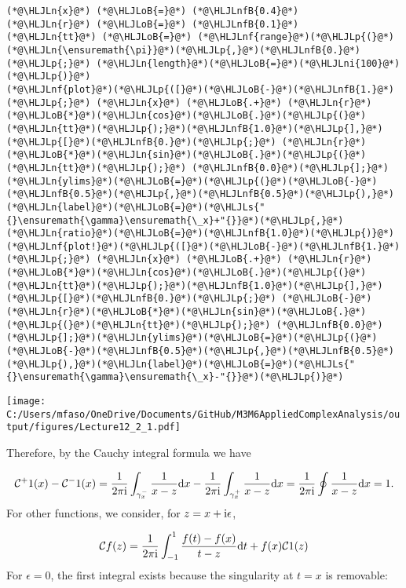 \documentclass[12pt,a4paper]{article}
\newcommand{\HLJLn}[1]{#1}
\newcommand{\HLJLnf}[1]{\textcolor[RGB]{66,102,213}{#1}}
\newcommand{\HLJLs}[1]{\textcolor[RGB]{201,61,57}{#1}}
\newcommand{\HLJLnfB}[1]{\textcolor[RGB]{59,151,46}{#1}}
\newcommand{\HLJLni}[1]{\textcolor[RGB]{59,151,46}{#1}}
\newcommand{\HLJLoB}[1]{\textcolor[RGB]{102,102,102}{\textbf{#1}}}
\newcommand{\HLJLp}[1]{#1}
\def\D{ {\rm d} }
\def\I{ {\rm i} }
\def\CC{ {\cal C} }
\def\dx{\D x}
\def\dt{\D t}
\begin{document}
\begin{lstlisting}
(*@\HLJLn{x}@*) (*@\HLJLoB{=}@*) (*@\HLJLnfB{0.4}@*)
(*@\HLJLn{r}@*) (*@\HLJLoB{=}@*) (*@\HLJLnfB{0.1}@*)
(*@\HLJLn{tt}@*) (*@\HLJLoB{=}@*) (*@\HLJLnf{range}@*)(*@\HLJLp{(}@*)(*@\HLJLn{\ensuremath{\pi}}@*)(*@\HLJLp{,}@*)(*@\HLJLnfB{0.}@*)(*@\HLJLp{;}@*) (*@\HLJLn{length}@*)(*@\HLJLoB{=}@*)(*@\HLJLni{100}@*)(*@\HLJLp{)}@*)
(*@\HLJLnf{plot}@*)(*@\HLJLp{([}@*)(*@\HLJLoB{-}@*)(*@\HLJLnfB{1.}@*)(*@\HLJLp{;}@*) (*@\HLJLn{x}@*) (*@\HLJLoB{.+}@*) (*@\HLJLn{r}@*)(*@\HLJLoB{*}@*)(*@\HLJLn{cos}@*)(*@\HLJLoB{.}@*)(*@\HLJLp{(}@*)(*@\HLJLn{tt}@*)(*@\HLJLp{);}@*)(*@\HLJLnfB{1.0}@*)(*@\HLJLp{],}@*) (*@\HLJLp{[}@*)(*@\HLJLnfB{0.}@*)(*@\HLJLp{;}@*) (*@\HLJLn{r}@*)(*@\HLJLoB{*}@*)(*@\HLJLn{sin}@*)(*@\HLJLoB{.}@*)(*@\HLJLp{(}@*)(*@\HLJLn{tt}@*)(*@\HLJLp{);}@*) (*@\HLJLnfB{0.0}@*)(*@\HLJLp{];}@*)(*@\HLJLn{ylims}@*)(*@\HLJLoB{=}@*)(*@\HLJLp{(}@*)(*@\HLJLoB{-}@*)(*@\HLJLnfB{0.5}@*)(*@\HLJLp{,}@*)(*@\HLJLnfB{0.5}@*)(*@\HLJLp{),}@*)(*@\HLJLn{label}@*)(*@\HLJLoB{=}@*)(*@\HLJLs{"{}\ensuremath{\gamma}\ensuremath{\_x}+"{}}@*)(*@\HLJLp{,}@*) (*@\HLJLn{ratio}@*)(*@\HLJLoB{=}@*)(*@\HLJLnfB{1.0}@*)(*@\HLJLp{)}@*)
(*@\HLJLnf{plot!}@*)(*@\HLJLp{([}@*)(*@\HLJLoB{-}@*)(*@\HLJLnfB{1.}@*)(*@\HLJLp{;}@*) (*@\HLJLn{x}@*) (*@\HLJLoB{.+}@*) (*@\HLJLn{r}@*)(*@\HLJLoB{*}@*)(*@\HLJLn{cos}@*)(*@\HLJLoB{.}@*)(*@\HLJLp{(}@*)(*@\HLJLn{tt}@*)(*@\HLJLp{);}@*)(*@\HLJLnfB{1.0}@*)(*@\HLJLp{],}@*) (*@\HLJLp{[}@*)(*@\HLJLnfB{0.}@*)(*@\HLJLp{;}@*) (*@\HLJLoB{-}@*)(*@\HLJLn{r}@*)(*@\HLJLoB{*}@*)(*@\HLJLn{sin}@*)(*@\HLJLoB{.}@*)(*@\HLJLp{(}@*)(*@\HLJLn{tt}@*)(*@\HLJLp{);}@*) (*@\HLJLnfB{0.0}@*)(*@\HLJLp{];}@*)(*@\HLJLn{ylims}@*)(*@\HLJLoB{=}@*)(*@\HLJLp{(}@*)(*@\HLJLoB{-}@*)(*@\HLJLnfB{0.5}@*)(*@\HLJLp{,}@*)(*@\HLJLnfB{0.5}@*)(*@\HLJLp{),}@*)(*@\HLJLn{label}@*)(*@\HLJLoB{=}@*)(*@\HLJLs{"{}\ensuremath{\gamma}\ensuremath{\_x}-"{}}@*)(*@\HLJLp{)}@*)
\end{lstlisting}

\texttt{[image: C:/Users/mfaso/OneDrive/Documents/GitHub/M3M6AppliedComplexAnalysis/output/figures/Lecture12\_2\_1.pdf]}

Therefore, by the Cauchy integral formula we have

\[
\CC^+ 1 (x) - \CC^- 1 (x) = {1 \over 2 \pi \I}\int_{\gamma_x^-} {1 \over x - z} \dx - {1 \over 2 \pi \I}\int_{\gamma_x^+} {1 \over x - z} \dx = {1 \over 2 \pi \I} \oint {1 \over x -z } \dx = 1.
\]
For other functions, we consider, for $z = x + \I \epsilon$,

\[
    {\cal C} f(z) =   {1 \over 2 \pi \I} \int_{-1}^1 {f(t) - f(x) \over t - z} \dt + f(x) \CC 1(z)
\]
For $\epsilon = 0$, the first integral exists because the singularity at $t = x$ is removable:
\end{document}
